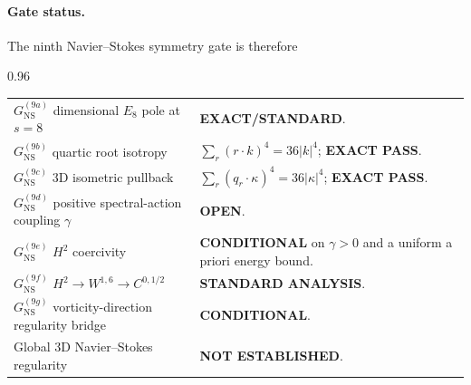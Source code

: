 \documentclass{article}
\begin{document}
\paragraph{Gate status.}
The ninth Navier--Stokes symmetry gate is therefore
\begin{center}
\begin{boxedminipage}{0.96\textwidth}
\small
\begin{tabularx}{\linewidth}{@{}lX@{}}
$G_{\mathrm{NS}}^{(9a)}$ dimensional $E_8$ pole at $s=8$
  & \textbf{EXACT/STANDARD}.\\
$G_{\mathrm{NS}}^{(9b)}$ quartic root isotropy
  & $\sum_r(r\cdot k)^4=36|k|^4$; \textbf{EXACT PASS}.\\
$G_{\mathrm{NS}}^{(9c)}$ 3D isometric pullback
  & $\sum_r(q_r\cdot\kappa)^4=36|\kappa|^4$; \textbf{EXACT PASS}.\\
$G_{\mathrm{NS}}^{(9d)}$ positive spectral-action coupling $\gamma$
  & \textbf{OPEN}.\\
$G_{\mathrm{NS}}^{(9e)}$ $H^2$ coercivity
  & \textbf{CONDITIONAL} on $\gamma>0$ and a uniform a priori energy bound.\\
$G_{\mathrm{NS}}^{(9f)}$ $H^2\to W^{1,6}\to C^{0,1/2}$
  & \textbf{STANDARD ANALYSIS}.\\
$G_{\mathrm{NS}}^{(9g)}$ vorticity-direction regularity bridge
  & \textbf{CONDITIONAL}.\\
Global 3D Navier--Stokes regularity
  & \textbf{NOT ESTABLISHED}.\\
\end{tabularx}
\end{boxedminipage}
\end{center}
\end{document}
